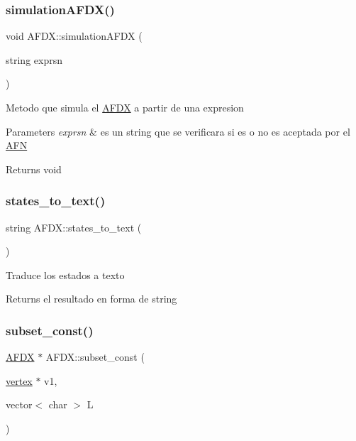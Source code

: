 \subsubsection{\texorpdfstring{simulation\+A\+F\+D\+X()}{simulationAFDX()}}
{\footnotesize\ttfamily void A\+F\+D\+X\+::simulation\+A\+F\+DX (\begin{DoxyParamCaption}\item[{string}]{exprsn }\end{DoxyParamCaption})}

Metodo que simula el \hyperlink{class_a_f_d_x}{A\+F\+DX} a partir de una expresion 
\begin{DoxyParams}{Parameters}
{\em exprsn} & es un string que se verificara si es o no es aceptada por el \hyperlink{class_a_f_n}{A\+FN} \\
\hline
\end{DoxyParams}
\begin{DoxyReturn}{Returns}
void 
\end{DoxyReturn}
\hypertarget{class_a_f_d_x_a1fa780c283bf7bafbc63c25102f9ae69}{}\label{class_a_f_d_x_a1fa780c283bf7bafbc63c25102f9ae69} 
\subsubsection{\texorpdfstring{states\+\_\+to\+\_\+text()}{states\_to\_text()}}
{\footnotesize\ttfamily string A\+F\+D\+X\+::states\+\_\+to\+\_\+text (\begin{DoxyParamCaption}{ }\end{DoxyParamCaption})}

Traduce los estados a texto \begin{DoxyReturn}{Returns}
el resultado en forma de string 
\end{DoxyReturn}
\hypertarget{class_a_f_d_x_a7f4f46c25fb5a5b3f1be898dde218aa2}{}\label{class_a_f_d_x_a7f4f46c25fb5a5b3f1be898dde218aa2} 
\subsubsection{\texorpdfstring{subset\+\_\+const()}{subset\_const()}}
{\footnotesize\ttfamily \hyperlink{class_a_f_d_x}{A\+F\+DX} $\ast$ A\+F\+D\+X\+::subset\+\_\+const (\begin{DoxyParamCaption}\item[{\hyperlink{structvertex}{vertex} $\ast$}]{v1,  }\item[{vector$<$ char $>$}]{L }\end{DoxyParamCaption})}

